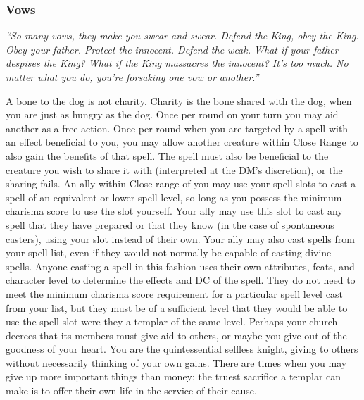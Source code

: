 \begin{optional}
\subsubsection{Vows}
\noindent\textit{``So many vows, they make you swear and swear. Defend the King, obey the King. Obey your father. Protect the innocent. Defend the weak. What if your father despises the King? What if the King massacres the innocent? It's too much. No matter what you do, you're forsaking one vow or another.''}

{A bone to the dog is not charity. Charity is the bone shared with the dog, when you are just as hungry as the dog.}
{Once per round on your turn you may aid another as a free action.}
{Once per round when you are targeted by a spell with an effect beneficial to you, you may allow another creature within Close Range to also gain the benefits of that spell. The spell must also be beneficial to the creature you wish to share it with (interpreted at the DM's discretion), or the sharing fails.}
{An ally within Close range of you may use your spell slots to cast a spell of an equivalent or lower spell level, so long as you possess the minimum charisma score to use the slot yourself. Your ally may use this slot to cast any spell that they have prepared or that they know (in the case of spontaneous casters), using your slot instead of their own. Your ally may also cast spells from your spell list, even if they would not normally be capable of casting divine spells. Anyone casting a spell in this fashion uses their own attributes, feats, and character level to determine the effects and DC of the spell. They do not need to meet the minimum charisma score requirement for a particular spell level cast from your list, but they must be of a sufficient level that they would be able to use the spell slot were they a templar of the same level.}
{Perhaps your church decrees that its members must give aid to others, or maybe you give out of the goodness of your heart. You are the quintessential selfless knight, giving to others without necessarily thinking of your own gains. There are times when you may give up more important things than money; the truest sacrifice a templar can make is to offer their own life in the service of their cause.}


\end{optional}
